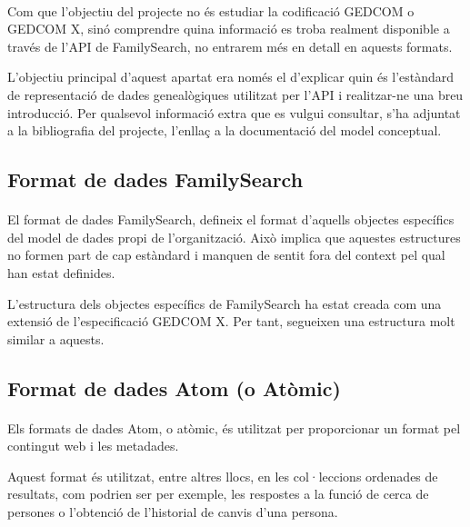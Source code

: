          \paragraph{}
         Com que l’objectiu del projecte no és estudiar la codificació GEDCOM o GEDCOM X, sinó comprendre quina informació es troba realment disponible a través de l'API de FamilySearch, no entrarem més en detall en aquests formats.

         L’objectiu principal d’aquest apartat era només el d'explicar quin és l'estàndard de representació de dades genealògiques utilitzat per l'API i realitzar-ne una breu introducció. Per qualsevol informació extra que es vulgui consultar, s'ha adjuntat a la bibliografia del projecte, l’enllaç a la documentació del model conceptual.


     \subsection{Format de dades FamilySearch}

        \paragraph{}
        El format de dades FamilySearch, defineix el format d'aquells objectes específics del model de dades propi de l'organització. Això implica que aquestes estructures no formen part de cap estàndard i manquen de sentit fora del context pel qual han estat definides.

        L'estructura dels objectes específics de FamilySearch ha estat creada com una extensió de l'especificació GEDCOM X. Per tant, segueixen una estructura molt similar a aquests.


    \subsection{Format de dades Atom (o Atòmic)}

        \paragraph{}
        Els formats de dades Atom, o atòmic, és utilitzat per proporcionar un format pel contingut web i les metadades.

        Aquest format és utilitzat, entre altres llocs, en les col·leccions ordenades de resultats, com podrien ser per exemple, les respostes a la funció de cerca de persones o l'obtenció de l'historial de canvis d’una persona.


